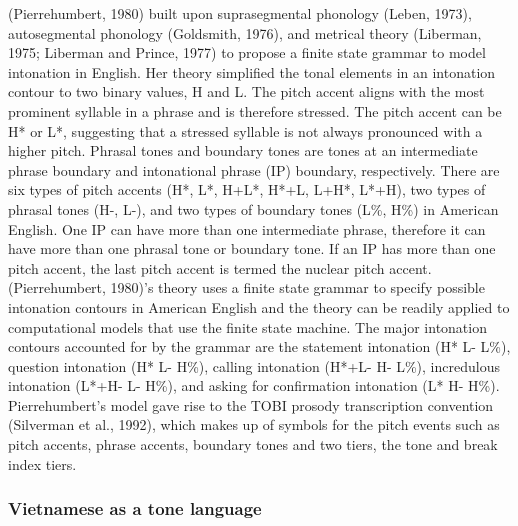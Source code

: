 \documentclass[a4paper]{article}
\begin{document}
(Pierrehumbert, 1980) built upon suprasegmental phonology (Leben, 1973), autosegmental phonology (Goldsmith, 1976), and metrical theory (Liberman, 1975; Liberman and Prince, 1977) to propose a finite state grammar to model intonation in English. Her theory simplified the tonal elements in an intonation contour to two binary values, H and L. The pitch accent aligns with the most prominent syllable in a phrase and is therefore stressed. The pitch accent can be H* or L*, suggesting that a stressed syllable is not always pronounced with a higher pitch. Phrasal tones and boundary tones are tones at an intermediate phrase boundary and intonational phrase (IP) boundary, respectively. There are six types of pitch accents (H*, L*, H+L*, H*+L, L+H*, L*+H), two types of phrasal tones (H-, L-), and two types of boundary tones (L\%, H\%) in American English. One IP can have more than one intermediate phrase, therefore it can have more than one phrasal tone or boundary tone. If an IP has more than one pitch accent, the last pitch accent is termed the nuclear pitch accent. (Pierrehumbert, 1980)'s theory uses a finite state grammar to specify possible intonation contours in American English and the theory can be readily applied to computational models that use the finite state machine. The major intonation contours accounted for by the grammar are the statement intonation (H* L- L\%), question intonation (H* L- H\%), calling intonation (H*+L- H- L\%), incredulous intonation (L*+H- L- H\%), and asking for confirmation intonation (L* H- H\%). Pierrehumbert's model gave rise to the TOBI prosody transcription convention (Silverman et al., 1992), which makes up of symbols for the pitch events such as pitch accents, phrase accents, boundary tones and two tiers, the tone and break index tiers.


\subsubsection{Vietnamese as a tone language}

\end{document}
